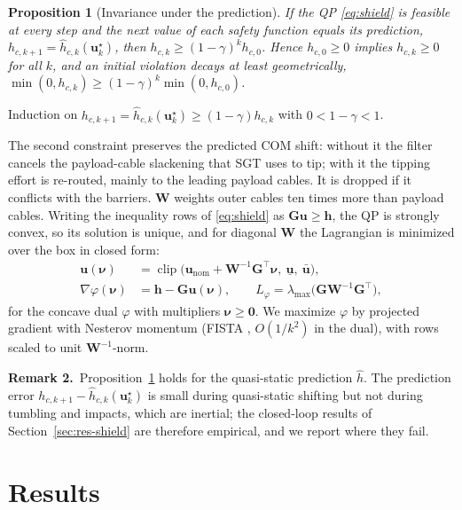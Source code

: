 \documentclass[letterpaper,10pt,conference]{IEEEtran}
\newcommand{\vect}[1]{\boldsymbol{#1}}
\newcommand{\remark}[1]{\noindent\textbf{Remark #1.}\ }
\newtheorem{proposition}{Proposition}
\DeclareMathOperator{\clip}{clip}
\begin{document}
\begin{proposition}[Invariance under the prediction]\label{prop:inv}
If the QP \eqref{eq:shield} is feasible at every step and the next value
of each safety function equals its prediction, $h_{c,k+1}=\hat h_{c,k}(\vect u^\star_k)$,
then $h_{c,k}\ge(1-\gamma)^k h_{c,0}$. Hence $h_{c,0}\ge0$ implies
$h_{c,k}\ge0$ for all $k$, and an initial violation decays at least
geometrically, $\min(0,h_{c,k})\ge(1-\gamma)^k\min(0,h_{c,0})$.
\end{proposition}
\begin{IEEEproof}
Induction on $h_{c,k+1}=\hat h_{c,k}(\vect u^\star_k)\ge(1-\gamma)h_{c,k}$
with $0<1-\gamma<1$.
\end{IEEEproof} The second
constraint preserves the predicted COM shift: without it the filter
cancels the payload-cable slackening that SGT uses to tip; with it the
tipping effort is re-routed, mainly to the leading payload cables. It
is dropped if it conflicts with the barriers. $\vect W$ weights outer
cables ten times more than payload cables. Writing the inequality rows
of \eqref{eq:shield} as $\vect G\vect u\ge\vect h$, the QP is strongly
convex, so its solution is unique, and for diagonal $\vect W$ the
Lagrangian is minimized over the box in closed form:
\begin{subequations}\label{eq:dual}
\begin{align}
\vect u(\vect\nu)&=\clip\big(\vect u_{\mathrm{nom}}+\vect W^{-1}\vect G^\top\vect\nu,\ \underline{\vect u},\ \bar{\vect u}\big),\\
\nabla\varphi(\vect\nu)&=\vect h-\vect G\vect u(\vect\nu),\qquad
L_\varphi=\lambda_{\max}\big(\vect G\vect W^{-1}\vect G^\top\big),
\end{align}
\end{subequations}
for the concave dual $\varphi$ with multipliers $\vect\nu\ge\vect 0$. We
maximize $\varphi$ by projected gradient with Nesterov momentum (FISTA
\cite{beck2009fista}, $O(1/k^2)$ in the dual), with rows scaled to unit
$\vect W^{-1}$-norm.

\remark{2}Proposition~\ref{prop:inv} holds for the quasi-static
prediction $\hat h$. The prediction error
$h_{c,k+1}-\hat h_{c,k}(\vect u^\star_k)$ is small during quasi-static
shifting but not during tumbling and impacts, which are inertial; the
closed-loop results of Section~\ref{sec:res-shield} are therefore
empirical, and we report where they fail.

\section{Results}\label{sec:results}
\end{document}
